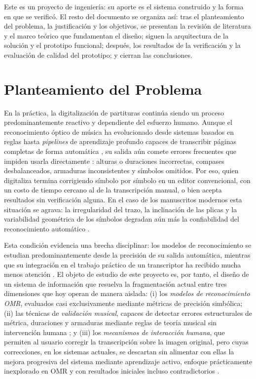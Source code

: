 \documentclass[conference]{IEEEtran}
\begin{document}
Este es un proyecto de ingeniería: su aporte es el sistema construido y la
forma en que se verificó. El resto del documento se organiza así: tras el
planteamiento del problema, la justificación y los objetivos, se presentan
la revisión de literatura y el marco teórico que fundamentan el diseño;
siguen la arquitectura de la solución y el prototipo funcional; después,
los resultados de la verificación y la evaluación de calidad del
prototipo; y cierran las conclusiones.


\section{Planteamiento del Problema}

En la práctica, la digitalización de partituras continúa siendo un
proceso predominantemente reactivo y dependiente del esfuerzo humano.
Aunque el reconocimiento óptico de música ha evolucionado desde sistemas
basados en reglas hasta \emph{pipelines} de aprendizaje profundo capaces de
transcribir páginas completas de forma automática
\cite{omr2020,calvo2018,riosvila2026}, su salida aún comete
errores frecuentes que impiden usarla directamente \cite{calvo2018}: alturas
o duraciones incorrectas, compases desbalanceados, armaduras inconsistentes
y símbolos omitidos. Por eso, quien digitaliza termina corrigiendo
símbolo por símbolo en un editor convencional, con un costo de tiempo
cercano al de la transcripción manual, o bien acepta resultados sin
verificación alguna. En el caso de los manuscritos modernos esta situación se
agrava: la irregularidad del trazo, la inclinación de las plicas y la
variabilidad geométrica de los símbolos degradan aún más la
confiabilidad del reconocimiento automático \cite{ricordi2024}.

Esta condición evidencia una brecha disciplinar: los modelos de
reconocimiento se estudian predominantemente desde la precisión de su
salida automática, mientras que su integración en el trabajo práctico
de un transcriptor ha recibido mucha menos atención \cite{rizo2023}. El
objeto de estudio de este proyecto es, por tanto, el diseño de un sistema
de información que resuelva la fragmentación actual entre tres
dimensiones que hoy operan de manera aislada: (i) los \emph{modelos de
reconocimiento OMR}, evaluados casi exclusivamente mediante métricas de
precisión simbólica; (ii) las técnicas de \emph{validación musical},
capaces de detectar errores estructurales de métrica, duraciones y
armaduras mediante reglas de teoría musical sin intervención humana
\cite{cuthbert2010}; y (iii) los \emph{mecanismos de interacción humana},
que permiten al usuario corregir la transcripción sobre la imagen
original, pero cuyas correcciones, en los sistemas actuales, se descartan
sin alimentar con ellas la mejora progresiva del sistema mediante
aprendizaje activo, enfoque prácticamente inexplorado en OMR y con
resultados iniciales incluso contradictorios
\cite{amershi2014,settles2009,mlsp2025}.
\end{document}
